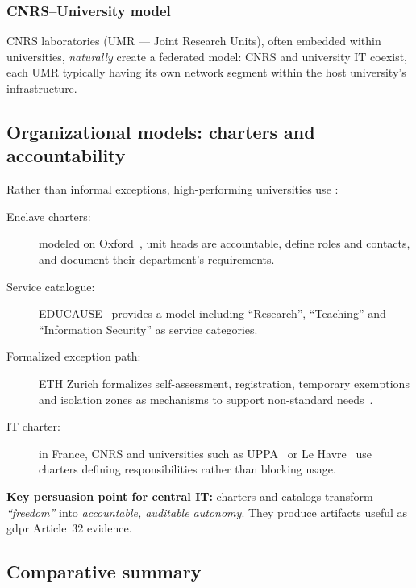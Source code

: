 \subsubsection{CNRS--University model}

CNRS laboratories (UMR --- Joint Research Units), often
embedded within universities, \emph{naturally} create a federated
model: CNRS and university IT coexist, each UMR typically having
its own network segment within the host university's
infrastructure.

\subsection{Organizational models: charters and accountability}

Rather than informal exceptions, high-performing universities
use :

\begin{description}
    \item[Enclave charters:] modeled on Oxford~\cite{oxford-infosec},
    unit heads are accountable, define roles and contacts,
    and document their department's requirements.
    \item[Service catalogue:] EDUCAUSE~\cite{educause-catalog}
    provides a model including ``Research'', ``Teaching'' and
    ``Information Security'' as service categories.
    \item[Formalized exception path:] ETH Zurich formalizes
    self-assessment, registration, temporary exemptions and
    isolation zones as mechanisms to support non-standard
    needs~\cite{eth-baseline}.
    \item[IT charter:] in France, CNRS and universities
    such as UPPA~\cite{uppa-charte} or Le Havre~\cite{lehavre-charte}
    use charters defining responsibilities rather than
    blocking usage.
\end{description}

\textbf{Key persuasion point for central IT:} charters and
catalogs transform \emph{``freedom''} into \emph{accountable,
auditable autonomy}. They produce artifacts useful
as \gls{gdpr} Article~32 evidence.

\subsection{Comparative summary}

